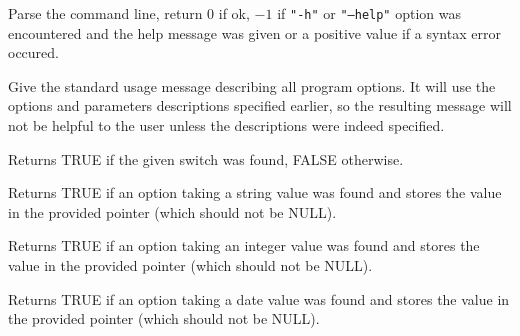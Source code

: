 \label{wxcmdlineparserparse}


Parse the command line, return $0$ if ok, $-1$ if {\tt "-h"} or {\tt "--help"} 
option was encountered and the help message was given or a positive value if a
syntax error occured.

\label{wxcmdlineparserusage}


Give the standard usage message describing all program options. It will use the
options and parameters descriptions specified earlier, so the resulting message
will not be helpful to the user unless the descriptions were indeed specified.



\label{wxcmdlineparserfoundswitch}


Returns TRUE if the given switch was found, FALSE otherwise.

\label{wxcmdlineparserfoundstringoption}


Returns TRUE if an option taking a string value was found and stores the
value in the provided pointer (which should not be NULL).

\label{wxcmdlineparserfoundintoption}


Returns TRUE if an option taking an integer value was found and stores
the value in the provided pointer (which should not be NULL).

\label{wxcmdlineparserfounddateoption}


Returns TRUE if an option taking a date value was found and stores the
value in the provided pointer (which should not be NULL).

\label{wxcmdlineparsergetparamcount}

